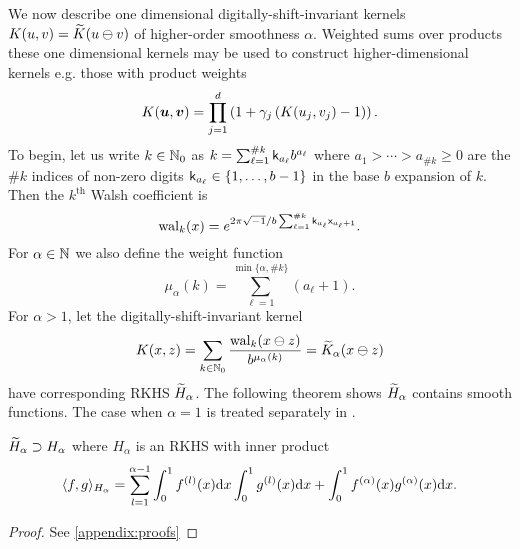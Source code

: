 \documentclass[acmsmall]{acmart}
\begin{document}
We now describe one dimensional digitally-shift-invariant kernels $K(u,v) = {\widetilde{K}}(u \ominus v)$ of higher-order smoothness $\alpha$. Weighted sums over products these one dimensional kernels may be used to construct higher-dimensional kernels e.g. those with product weights 
$$K({\boldsymbol{u}},{\boldsymbol{v}}) = \prod_{j=1}^d \left(1+\gamma_j  \left(K(u_j,v_j)-1\right)\right).$$
To begin, let us write $k \in {\mathbb{N}}_0$ as $k = \sum_{\ell=1}^{\#k} {\mathsf{k}}_{a_\ell} b^{a_\ell}$ where $a_1 > \cdots > a_{\#k} \geq 0$ are the $\#k$ indices of non-zero digits ${\mathsf{k}}_{a_\ell} \in \{1,\dots,b-1\}$ in the base $b$ expansion of $k$. Then the $k^\mathrm{th}$ Walsh coefficient is 
$$\mathrm{wal}_k(x) = e^{2 \pi \sqrt{-1}/b \sum_{\ell=1}^{\#k} {\mathsf{k}}_{a_\ell} {\mathsf{x}}_{a_\ell+1}}.$$ 
For $\alpha \in {\mathbb{N}}$ we also define the weight function 
$$\mu_\alpha(k) = \sum_{\ell=1}^{\min\{\alpha,\#k\}} (a_\ell+1).$$
For $\alpha>1$, let the digitally-shift-invariant kernel 
\begin{equation}
    K(x,z) = \sum_{k \in {\mathbb{N}}_0} \frac{\mathrm{wal}_k(x \ominus z)}{b^{\mu_\alpha(k)}} = {\widetilde{K}}_\alpha(x \ominus z)
    \label{eq:DSI_kernel}
\end{equation}
have corresponding RKHS ${\widetilde{H}}_\alpha$. The following theorem shows ${\widetilde{H}}_\alpha$ contains smooth functions. The case when $\alpha=1$ is treated separately in \citep{dick.multivariate_integraion_sobolev_spaces_digital_nets}.   
\begin{theorem} \label{thm:RKHS_DSI_contain}
    ${\widetilde{H}}_\alpha \supset H_\alpha$ where $H_\alpha$ is an RKHS with inner product 
    $$\langle f,g \rangle_{H_\alpha} =\sum_{l=1}^{\alpha-1} \int_0^1 f^{(l)}(x) \mathrm{d} x \int_0^1 g^{(l)}(x) \mathrm{d} x + \int_0^1 f^{(\alpha)}(x) g^{(\alpha)}(x) \mathrm{d} x.$$
\end{theorem}
\begin{proof} 
    See \cref{appendix:proofs}
\end{proof}
\end{document}
